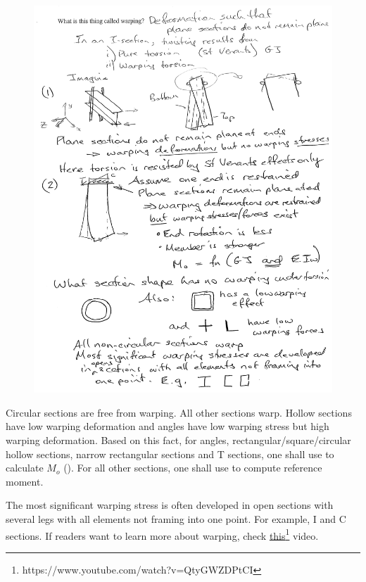 \begin{figure}[H]
\centering
\includegraphics[width=.99\textwidth]{PIC/CH05/WARPINGO}
\end{figure}
Circular sections are free from warping. All other sections warp. Hollow sections have low warping deformation and angles have low warping stress but high warping deformation. Based on this fact, for angles, rectangular/square/circular hollow sections, narrow rectangular sections and T sections, one shall use  to calculate $M_o$ (). For all other sections, one shall use  to compute reference moment.

The most significant warping stress is often developed in open sections with several legs with all elements not framing into one point. For example, I and C sections. If readers want to learn more about warping, check \href{https://www.youtube.com/watch?v=QtyGWZDPtCI}{this}\footnote{https://www.youtube.com/watch?v=QtyGWZDPtCI} video.

